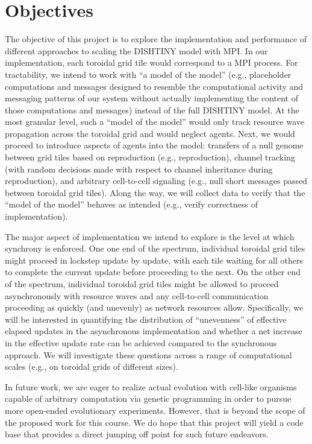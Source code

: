 \section{Objectives}

The objective of this project is to explore the implementation and performance of different approaches to scaling the DISHTINY model with MPI.
In our implementation, each toroidal grid tile would correspond to a MPI process.
For tractability, we intend to work with ``a model of the model'' (e.g., placeholder computations and messages designed to resemble the computational activity and messaging patterns of our system without actually implementing the content of those computations and messages) instead of the full DISHTINY model.
At the most granular level, such a ``model of the model'' would only track resource wave propagation across the toroidal grid and would neglect agents.
Next, we would proceed to introduce aspects of agents into the model: transfers of a null genome between grid tiles based on reproduction (e.g., reproduction), channel tracking (with random decisions made with respect to channel inheritance during reproduction), and arbitrary cell-to-cell signaling (e.g., null short messages passed between toroidal grid tiles).
Along the way, we will collect data to verify that the ``model of the model'' behaves as intended (e.g., verify correctness of implementation).

The major aspect of implementation we intend to explore is the level at which synchrony is enforced.
One one end of the spectrum, individual toroidal grid tiles might proceed in lockstep update by update, with each tile waiting for all others to complete the current update before proceeding to the next.
On the other end of the spectrum, individual toroidal grid tiles might be allowed to proceed asynchronously with resource waves and any cell-to-cell communication proceeding as quickly (and unevenly) as network resources allow.
Specifically, we will be interested in quantifying the distribution of ``unevenness'' of effective elapsed updates in the asynchronous implementation and whether a net increase in the effective update rate can be achieved compared to the synchronous approach.
We will investigate these questions across a range of computational scales (e.g., on toroidal grids of different sizes). 


In future work, we are eager to realize actual evolution with cell-like organisms capable of arbitrary computation via genetic programming in order to pursue more open-ended evolutionary experiments.
However, that is beyond the scope of the proposed work for this course.
We do hope that this project will yield a code base that provides a direct jumping off point for such future endeavors.
